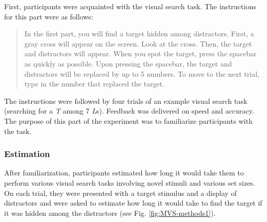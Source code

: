 \documentclass[12pt,twoside]{reedthesis}
\begin{document}
First, participants were acquainted with the visual search task. The instructions for this part were as follows:
\begin{quote}
In the first part, you will find a target hidden among distractors. First, a gray cross will appear on the screen. Look at the cross. Then, the target and distractors will appear. When you spot the target, press the spacebar as quickly as possible. Upon pressing the spacebar, the target and distractors will be replaced by up to 5 numbers. To move to the next trial, type in the number that replaced the target.
\end{quote}
The instructions were followed by four trials of an example visual search task (searching for a \emph{T} among 7 \emph{L}s). Feedback was delivered on speed and accuracy. The purpose of this part of the experiment was to familiarize participants with the task.

\hypertarget{estimation}{%
\subsubsection*{Estimation}\label{estimation}}

After familiarization, participants estimated how long it would take them to perform various visual search tasks involving novel stimuli and various set sizes. On each trial, they were presented with a target stimulus and a display of distractors and were asked to estimate how long it would take to find the target if it was hidden among the distractors (see Fig. \ref{fig:MVS-methods1}).
\end{document}
